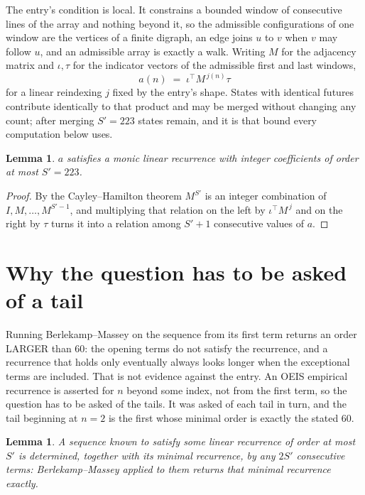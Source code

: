 \documentclass[11pt,a4paper]{article}
\theoremstyle{plain}
\newtheorem{lemma}[theorem]{Lemma}
\theoremstyle{definition}
\begin{document}
The entry's condition is local. It constrains a bounded window of consecutive lines of the
array and nothing beyond it, so the admissible configurations of one window are the vertices of
a finite digraph, an edge joins $u$ to $v$ when $v$ may follow $u$, and an admissible array is
exactly a walk. Writing $M$ for the adjacency matrix and $\iota,\tau$ for the indicator vectors
of the admissible first and last windows,
\[
a(n)\;=\;\iota^{\!\top}M^{\,j(n)}\tau
\]
for a linear reindexing $j$ fixed by the entry's shape. States with identical futures
contribute identically to that product and may be merged without changing any count; after
merging $S'=223$ states remain, and it is that bound every computation below uses.

\begin{lemma}\label{lem:cf}
$a$ satisfies a monic linear recurrence with integer coefficients of order at most $S'=223$.
\end{lemma}

\begin{proof}
By the Cayley--Hamilton theorem $M^{S'}$ is an integer combination of $I,M,\dots,M^{S'-1}$,
and multiplying that relation on the left by $\iota^{\!\top}M^{\,j}$ and on the right by
$\tau$ turns it into a relation among $S'+1$ consecutive values of $a$.
\end{proof}

\section{Why the question has to be asked of a tail}

Running Berlekamp--Massey on the sequence from its first term returns an order LARGER than $60$: the opening terms do not satisfy the recurrence, and a recurrence that holds only eventually always looks longer when the exceptional terms are included. That is not evidence against the entry. An OEIS empirical recurrence is asserted for $n$ beyond some index, not from the first term, so the question has to be asked of the tails. It was asked of each tail in turn, and the tail beginning at $n=2$ is the first whose minimal order is exactly the stated $60$.

\begin{lemma}\label{lem:bm}
A sequence known to satisfy some linear recurrence of order at most $S'$ is determined,
together with its minimal recurrence, by any $2S'$ consecutive terms: Berlekamp--Massey applied
to them returns that minimal recurrence exactly.
\end{lemma}
\end{document}
